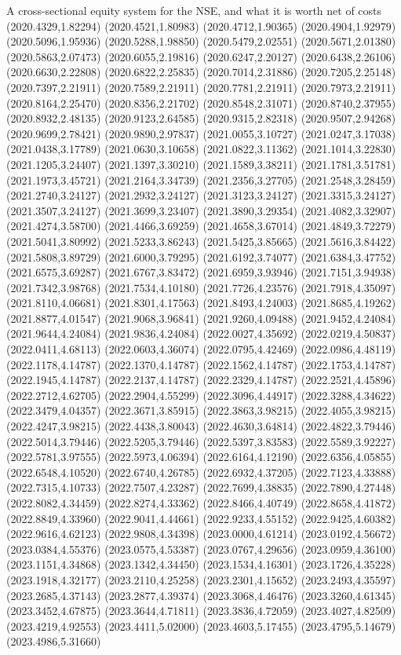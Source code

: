 \documentclass[aspectratio=169,10pt]{beamer}
\begin{document}
\begin{frame}[t]{A cross-sectional equity system for the NSE, and what it is worth net of costs}
(2020.4329,1.82294) (2020.4521,1.80983) (2020.4712,1.90365) (2020.4904,1.92979) (2020.5096,1.95936) (2020.5288,1.98850) (2020.5479,2.02551) (2020.5671,2.01380) (2020.5863,2.07473) (2020.6055,2.19816) (2020.6247,2.20127) (2020.6438,2.26106) (2020.6630,2.22808) (2020.6822,2.25835) (2020.7014,2.31886) (2020.7205,2.25148) (2020.7397,2.21911) (2020.7589,2.21911) (2020.7781,2.21911) (2020.7973,2.21911) (2020.8164,2.25470) (2020.8356,2.21702) (2020.8548,2.31071) (2020.8740,2.37955) (2020.8932,2.48135) (2020.9123,2.64585) (2020.9315,2.82318) (2020.9507,2.94268) (2020.9699,2.78421) (2020.9890,2.97837) (2021.0055,3.10727) (2021.0247,3.17038) (2021.0438,3.17789) (2021.0630,3.10658) (2021.0822,3.11362) (2021.1014,3.22830) (2021.1205,3.24407) (2021.1397,3.30210) (2021.1589,3.38211) (2021.1781,3.51781) (2021.1973,3.45721) (2021.2164,3.34739) (2021.2356,3.27705) (2021.2548,3.28459) (2021.2740,3.24127) (2021.2932,3.24127) (2021.3123,3.24127) (2021.3315,3.24127) (2021.3507,3.24127) (2021.3699,3.23407) (2021.3890,3.29354) (2021.4082,3.32907) (2021.4274,3.58700) (2021.4466,3.69259) (2021.4658,3.67014) (2021.4849,3.72279) (2021.5041,3.80992) (2021.5233,3.86243) (2021.5425,3.85665) (2021.5616,3.84422) (2021.5808,3.89729) (2021.6000,3.79295) (2021.6192,3.74077) (2021.6384,3.47752) (2021.6575,3.69287) (2021.6767,3.83472) (2021.6959,3.93946) (2021.7151,3.94938) (2021.7342,3.98768) (2021.7534,4.10180) (2021.7726,4.23576) (2021.7918,4.35097) (2021.8110,4.06681) (2021.8301,4.17563) (2021.8493,4.24003) (2021.8685,4.19262) (2021.8877,4.01547) (2021.9068,3.96841) (2021.9260,4.09488) (2021.9452,4.24084) (2021.9644,4.24084) (2021.9836,4.24084) (2022.0027,4.35692) (2022.0219,4.50837) (2022.0411,4.68113) (2022.0603,4.36074) (2022.0795,4.42469) (2022.0986,4.48119) (2022.1178,4.14787) (2022.1370,4.14787) (2022.1562,4.14787) (2022.1753,4.14787) (2022.1945,4.14787) (2022.2137,4.14787) (2022.2329,4.14787) (2022.2521,4.45896) (2022.2712,4.62705) (2022.2904,4.55299) (2022.3096,4.44917) (2022.3288,4.34622) (2022.3479,4.04357) (2022.3671,3.85915) (2022.3863,3.98215) (2022.4055,3.98215) (2022.4247,3.98215) (2022.4438,3.80043) (2022.4630,3.64814) (2022.4822,3.79446) (2022.5014,3.79446) (2022.5205,3.79446) (2022.5397,3.83583) (2022.5589,3.92227) (2022.5781,3.97555) (2022.5973,4.06394) (2022.6164,4.12190) (2022.6356,4.05855) (2022.6548,4.10520) (2022.6740,4.26785) (2022.6932,4.37205) (2022.7123,4.33888) (2022.7315,4.10733) (2022.7507,4.23287) (2022.7699,4.38835) (2022.7890,4.27448) (2022.8082,4.34459) (2022.8274,4.33362) (2022.8466,4.40749) (2022.8658,4.41872) (2022.8849,4.33960) (2022.9041,4.44661) (2022.9233,4.55152) (2022.9425,4.60382) (2022.9616,4.62123) (2022.9808,4.34398) (2023.0000,4.61214) (2023.0192,4.56672) (2023.0384,4.55376) (2023.0575,4.53387) (2023.0767,4.29656) (2023.0959,4.36100) (2023.1151,4.34868) (2023.1342,4.34450) (2023.1534,4.16301) (2023.1726,4.35228) (2023.1918,4.32177) (2023.2110,4.25258) (2023.2301,4.15652) (2023.2493,4.35597) (2023.2685,4.37143) (2023.2877,4.39374) (2023.3068,4.46476) (2023.3260,4.61345) (2023.3452,4.67875) (2023.3644,4.71811) (2023.3836,4.72059) (2023.4027,4.82509) (2023.4219,4.92553) (2023.4411,5.02000) (2023.4603,5.17455) (2023.4795,5.14679) (2023.4986,5.31660) 
\end{frame}
\end{document}
